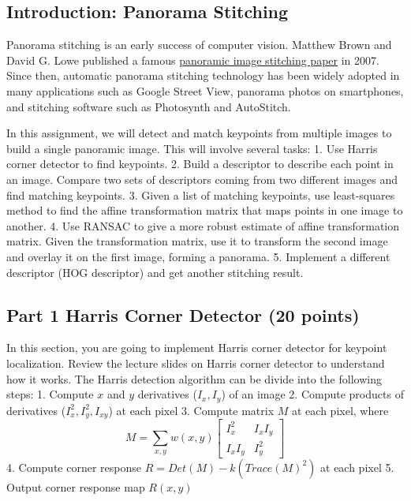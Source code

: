 \documentclass[11pt]{article}
\begin{document}
    \subsection{Introduction: Panorama
Stitching}\label{introduction-panorama-stitching}

Panorama stitching is an early success of computer vision. Matthew Brown
and David G. Lowe published a famous
\href{http://matthewalunbrown.com/papers/ijcv2007.pdf}{panoramic image
stitching paper} in 2007. Since then, automatic panorama stitching
technology has been widely adopted in many applications such as Google
Street View, panorama photos on smartphones, and stitching software such
as Photosynth and AutoStitch.

In this assignment, we will detect and match keypoints from multiple
images to build a single panoramic image. This will involve several
tasks: 1. Use Harris corner detector to find keypoints. 2. Build a
descriptor to describe each point in an image. Compare two sets of
descriptors coming from two different images and find matching
keypoints. 3. Given a list of matching keypoints, use least-squares
method to find the affine transformation matrix that maps points in one
image to another. 4. Use RANSAC to give a more robust estimate of affine
transformation matrix. Given the transformation matrix, use it to
transform the second image and overlay it on the first image, forming a
panorama. 5. Implement a different descriptor (HOG descriptor) and get
another stitching result.

    \subsection{Part 1 Harris Corner Detector (20
points)}\label{part-1-harris-corner-detector-20-points}

In this section, you are going to implement Harris corner detector for
keypoint localization. Review the lecture slides on Harris corner
detector to understand how it works. The Harris detection algorithm can
be divide into the following steps: 1. Compute \(x\) and \(y\)
derivatives (\(I_x, I_y\)) of an image 2. Compute products of
derivatives (\(I_x^2, I_y^2, I_{xy}\)) at each pixel 3. Compute matrix
\(M\) at each pixel, where \[
M = \sum_{x,y} w(x,y)
    \begin{bmatrix}
        I_{x}^2 & I_{x}I_{y} \\
        I_{x}I_{y} & I_{y}^2
    \end{bmatrix}
\] 4. Compute corner response \(R=Det(M)-k(Trace(M)^2)\) at each pixel
5. Output corner response map \(R(x,y)\)
\end{document}

